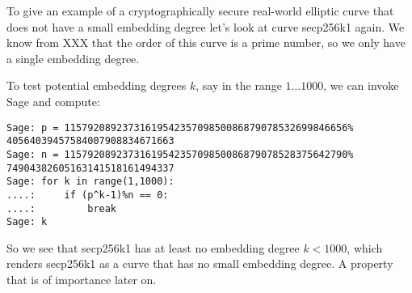 \begin{example} To give an example of a cryptographically secure real-world elliptic curve that does not have a small embedding degree let's look at curve secp256k1 again. We know from XXX that the order of this curve is a prime number, so we only have a single embedding degree.

To test potential embedding degrees $k$, say in the range $1\ldots 1000$, we can invoke Sage and compute:
\begin{verbatim}
Sage: p = 1157920892373161954235709850086879078532699846656%
40564039457584007908834671663
Sage: n = 1157920892373161954235709850086879078528375642790%
74904382605163141518161494337
Sage: for k in range(1,1000):
....:     if (p^k-1)%n == 0:
....:         break
Sage: k
\end{verbatim}
So we see that secp256k1 has at least no embedding degree $k<1000$, which renders secp256k1 as a curve that has no small embedding degree. A property that is of importance later on.
\end{example}
